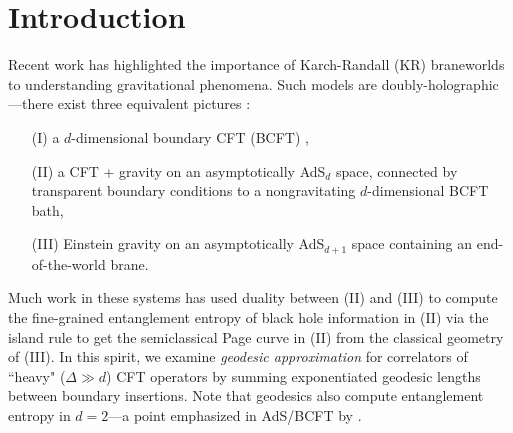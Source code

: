\documentclass[reprint,amsmath,amssymb,aps,nofootinbib,twocolumn]{revtex4-2}
\begin{document}
\begin{abstract}

\end{abstract}

\maketitle

%



\section{Introduction}

Recent work has highlighted the importance of Karch-Randall (KR) braneworlds \cite{Randall:1999vf,Karch:2000ct} to understanding gravitational phenomena. Such models are doubly-holographic---there exist three equivalent pictures \cite{Karch:2000gx,Geng:2020qvw,Neuenfeld:2021wbl}:
\begin{itemize}
\item[(I)] a $d$-dimensional boundary CFT (BCFT) \cite{McAvity:1995zd,Cardy:2004hm},
\item[(II)] a CFT + gravity on an asymptotically AdS$_d$ space, connected by transparent boundary conditions to a nongravitating $d$-dimensional BCFT bath,
\item[(III)] Einstein gravity on an asymptotically AdS$_{d+1}$ space containing an end-of-the-world brane.
\end{itemize}
Much work in these systems has used duality between (II) and (III) to compute the fine-grained entanglement entropy of black hole information in (II) via the island rule \cite{2020JHEP...09..002P,Almheiri:2019hni,Almheiri:2019psy,Chen:2020uac,Almheiri:2020cfm} to get the semiclassical Page curve in (II) from the classical geometry of (III). In this spirit, we examine \textit{geodesic approximation} \cite{Balasubramanian:1999zv,Balasubramanian:2012tu} for correlators of ``heavy" ($\Delta \gg d$) CFT operators by summing exponentiated geodesic lengths between  boundary insertions. Note that geodesics also compute entanglement entropy in $d = 2$---a point emphasized in AdS/BCFT by \cite{Takayanagi:2020njm}.
\end{document}

